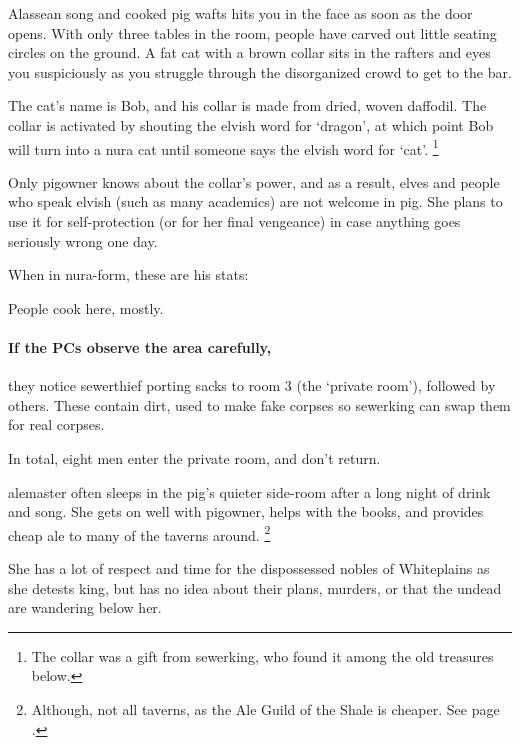 \begin{multicols}{2}
\begin{boxtext}
  Alassean song and cooked pig wafts hits you in the face as soon as the door opens.
  With only three tables in the room, people have carved out little seating circles on the ground.
  A fat cat with a brown collar sits in the rafters and eyes you suspiciously as you struggle through the disorganized crowd to get to the bar.

\end{boxtext}

The cat's name is Bob, and his collar is made from dried, woven daffodil.  The collar is activated by shouting the elvish word for `dragon', at which point Bob will turn into a nura cat until someone says the elvish word for `cat'.%
\footnote{The collar was a gift from \gls{sewerking}, who found it among the old treasures below.}

Only \gls{pigowner} knows about the collar's power, and as a result, elves and people who speak elvish (such as many academics) are not welcome in \gls{pig}.
She plans to use it for self-protection (or for her final vengeance) in case anything goes seriously wrong one day.

When in nura-form, these are his stats:



People cook here, mostly.

\paragraph{If the PCs observe the area carefully,}
they notice \gls{sewerthief} porting sacks to room 3 (the `private room'), followed by others.
These contain dirt, used to make fake corpses so \gls{sewerking} can swap them for real corpses.

In total, eight men enter the private room, and don't return.

\pigowner

\label{pigPrivate}

\Gls{alemaster} often sleeps in the \gls{pig}'s quieter side-room after a long night of drink and song.
She gets on well with \gls{pigowner}, helps with the books, and provides cheap ale to many of the taverns around.%
\footnote{Although, not all taverns, as the Ale Guild of the Shale is cheaper.
See page \pageref{troubleAle}.}

She has a lot of respect and time for the dispossessed nobles of Whiteplains as she detests \gls{king}, but has no idea about their plans, murders, or that the undead are wandering below her.


\end{multicols}
